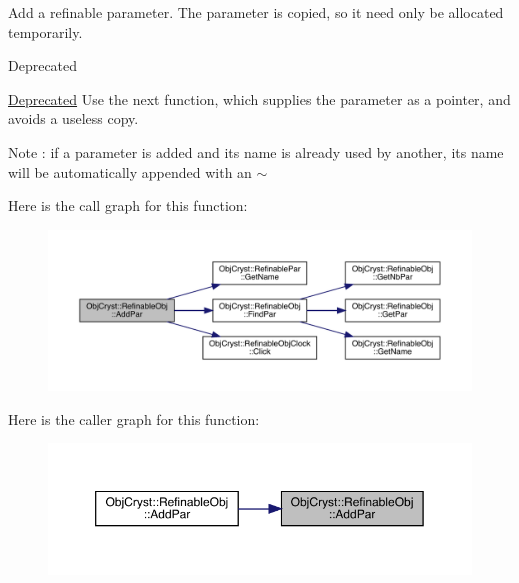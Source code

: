 Add a refinable parameter. The parameter is copied, so it need only be allocated temporarily.

\begin{DoxyRefDesc}{Deprecated}
\item[\mbox{\hyperlink{deprecated__deprecated000001}{Deprecated}}]Use the next function, which supplies the parameter as a pointer, and avoids a useless copy. \end{DoxyRefDesc}
\begin{DoxyNote}{Note}
\+: if a parameter is added and its name is already used by another, its name will be automatically appended with an $\sim$ 
\end{DoxyNote}
Here is the call graph for this function\+:
\nopagebreak
\begin{figure}[H]
\begin{center}
\leavevmode
\includegraphics[width=350pt]{class_obj_cryst_1_1_refinable_obj_a0c0050a3d3141ca34eb8f4b559ad2f8d_cgraph}
\end{center}
\end{figure}
Here is the caller graph for this function\+:
\nopagebreak
\begin{figure}[H]
\begin{center}
\leavevmode
\includegraphics[width=350pt]{class_obj_cryst_1_1_refinable_obj_a0c0050a3d3141ca34eb8f4b559ad2f8d_icgraph}
\end{center}
\end{figure}
\mbox{\label{class_obj_cryst_1_1_refinable_obj_a4a792c84f7d35e71b3e89aae5a87bffa}} 
